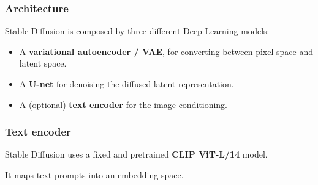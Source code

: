 \begin{frame}
    \frametitle{Architecture}
    Stable Diffusion is composed by three different Deep Learning models:
    \begin{itemize}
        \item A \textbf{variational autoencoder / VAE}, for converting between pixel space and latent space.
        \item A \textbf{U-net} for denoising the diffused latent representation.
        \item A (optional) \textbf{text encoder} for the image conditioning.
    \end{itemize}
\end{frame}

\begin{frame}
    \frametitle{Text encoder}
    Stable Diffusion uses a fixed and pretrained \textbf{CLIP ViT-L/14} model.

    It maps text prompts into an embedding space.
\end{frame}